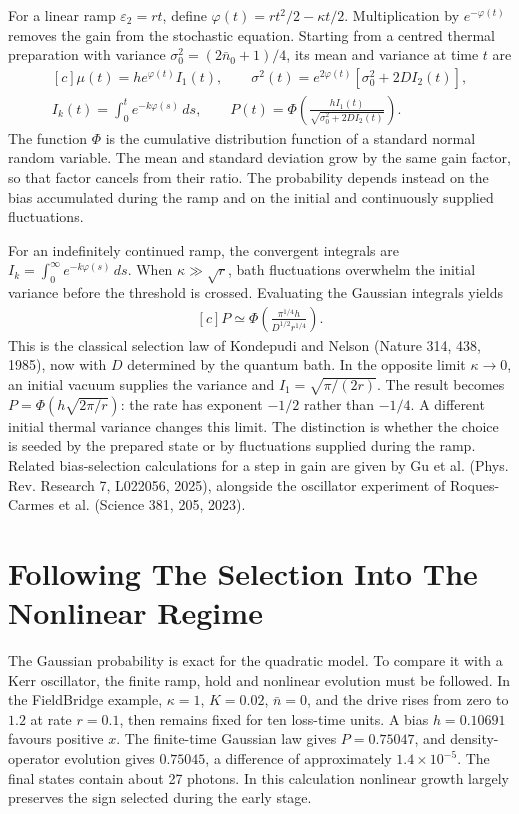 \documentclass[11pt,oneside]{book}
\newenvironment{centeredalign}{\[\begin{gathered}[c]}{\end{gathered}\]}
\begin{document}
For a linear ramp \(\varepsilon_2=rt\), define
\(\varphi(t)=rt^2/2-\kappa t/2\). Multiplication by
\(e^{-\varphi(t)}\) removes the gain from the stochastic
equation. Starting from a centred thermal preparation with
variance \(\sigma_0^2=(2\bar n_0+1)/4\), its mean and variance
at time \(t\) are
\begin{centeredalign}
\mu(t)=h e^{\varphi(t)}I_1(t),\qquad
\sigma^2(t)=e^{2\varphi(t)}[\sigma_0^2+2DI_2(t)],\\
I_k(t)=\int_0^t e^{-k\varphi(s)}\,ds,\qquad
P(t)=\Phi\!\left(\frac{hI_1(t)}{\sqrt{\sigma_0^2+2DI_2(t)}}\right).
\end{centeredalign}
The function \(\Phi\) is the cumulative distribution function
of a standard normal random variable. The mean and standard
deviation grow by the same gain factor, so that factor cancels
from their ratio. The probability depends instead on the bias
accumulated during the ramp and on the initial and continuously
supplied fluctuations.

For an indefinitely continued ramp, the convergent integrals are
\(I_k=\int_0^\infty e^{-k\varphi(s)}\,ds\). When
\(\kappa\gg\sqrt r\), bath fluctuations overwhelm the initial
variance before the threshold is crossed. Evaluating the
Gaussian integrals yields
\begin{centeredalign}
P\simeq\Phi\!\left(\frac{\pi^{1/4}h}{D^{1/2}r^{1/4}}\right).
\end{centeredalign}
This is the classical selection law of Kondepudi and Nelson
(Nature 314, 438, 1985), now with \(D\) determined by the
quantum bath. In the opposite limit \(\kappa\to0\), an
initial vacuum supplies the variance and
\(I_1=\sqrt{\pi/(2r)}\). The result becomes
\(P=\Phi(h\sqrt{2\pi/r})\): the rate has exponent
\(-1/2\) rather than \(-1/4\). A different initial thermal
variance changes this limit. The distinction is whether the
choice is seeded by the prepared state or by fluctuations
supplied during the ramp. Related bias-selection calculations
for a step in gain are given by Gu et al. (Phys. Rev. Research
7, L022056, 2025), alongside the oscillator experiment of
Roques-Carmes et al. (Science 381, 205, 2023).

\section{Following The Selection Into The Nonlinear Regime}
The Gaussian probability is exact for the quadratic model.
To compare it with a Kerr oscillator, the finite ramp, hold
and nonlinear evolution must be followed. In the FieldBridge
example, \(\kappa=1\), \(K=0.02\), \(\bar n=0\), and
the drive rises from zero to \(1.2\) at rate \(r=0.1\),
then remains fixed for ten loss-time units. A bias
\(h=0.10691\) favours positive \(x\). The finite-time
Gaussian law gives \(P=0.75047\), and density-operator
evolution gives \(0.75045\), a difference of approximately
\(1.4\times10^{-5}\). The final states contain about
27 photons. In this calculation nonlinear growth largely
preserves the sign selected during the early stage.
\end{document}
